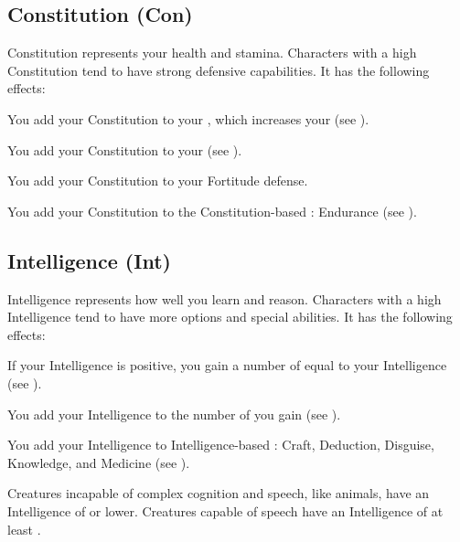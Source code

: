   \subsection{Constitution (Con)}\label{Constitution}
    {
      Constitution represents your health and stamina.
      Characters with a high Constitution tend to have strong defensive capabilities.
      It has the following effects:
      \begin{raggeditemize}
        \item You add your Constitution to your , which increases your  (see ).
        \item You add your Constitution to your  (see ).
        \item You add your Constitution to your Fortitude defense.
        \item You add your Constitution to the Constitution-based : Endurance (see ).
      \end{raggeditemize}
    }

  \subsection{Intelligence (Int)}\label{Intelligence}
    {
      Intelligence represents how well you learn and reason.
      Characters with a high Intelligence tend to have more options and special abilities.
      It has the following effects:

      \begin{raggeditemize}
        \item If your Intelligence is positive, you gain a number of  equal to your Intelligence (see ).
        \item You add your Intelligence to the number of  you gain (see ).
        \item You add your Intelligence to Intelligence-based : Craft, Deduction, Disguise, Knowledge, and Medicine (see ).
      \end{raggeditemize}

      \par Creatures incapable of complex cognition and speech, like animals, have an Intelligence of  or lower.
      Creatures capable of speech have an Intelligence of at least .
    }

